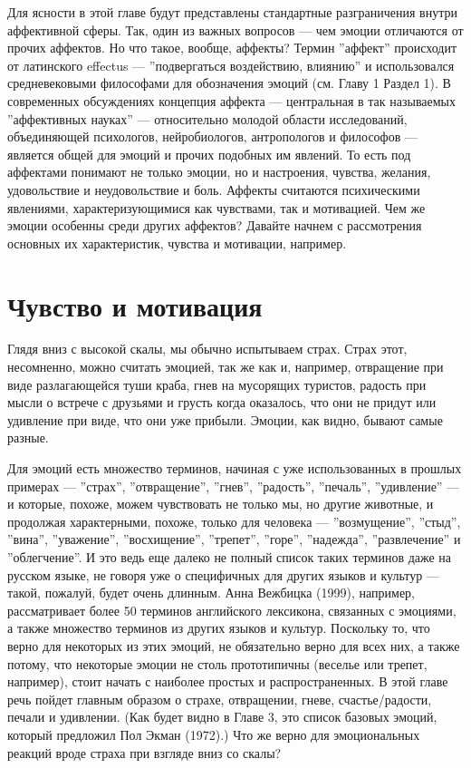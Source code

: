 \documentclass[11pt]{book}
\begin{document}
Для ясности в этой главе будут представлены стандартные разграничения внутри аффективной сферы. Так, один из важных вопросов --- чем эмоции отличаются от прочих аффектов. Но что такое, вообще, аффекты? Термин ''аффект'' происходит от латинского effectus --- ''подвергаться воздействию, влиянию'' и использовался средневековыми философами для обозначения эмоций (см. Главу 1 Раздел 1). В современных обсуждениях концепция аффекта --- центральная в так называемых ''аффективных науках'' --- относительно молодой области исследований, объединяющей психологов, нейробиологов, антропологов и философов --- является общей для эмоций и прочих подобных им явлений. То есть под аффектами понимают не только эмоции, но и настроения, чувства, желания, удовольствие и неудовольствие и боль. Аффекты считаются психическими явлениями, характеризующимися как чувствами, так и мотивацией. Чем же эмоции особенны среди других аффектов? Давайте начнем с рассмотрения основных их характеристик, чувства и мотивации, например.

\section{Чувство и мотивация}

Глядя вниз с высокой скалы, мы обычно испытываем страх. Страх этот, несомненно, можно считать эмоцией, так же как и, например, отвращение при виде разлагающейся туши краба, гнев на мусорящих туристов, радость при мысли о встрече с друзьями и грусть когда оказалось, что они не придут или удивление при виде, что они уже прибыли. Эмоции, как видно, бывают самые разные.

Для эмоций есть множество терминов, начиная с уже использованных в прошлых примерах --- ''страх'', ''отвращение'', ''гнев'', ''радость'', ''печаль'', ''удивление'' --- и которые, похоже, можем чувствовать не только мы, но другие животные, и продолжая характерными, похоже, только для человека --- ''возмущение'', ''стыд'', ''вина'', ''уважение'', ''восхищение'', ''трепет'', ''горе'', ''надежда'', ''развлечение'' и ''облегчение''. И это ведь еще далеко не полный список таких терминов даже на русском языке, не говоря уже о специфичных для других языков и культур --- такой, пожалуй, будет очень длинным. Анна Вежбицка (1999), например, рассматривает более 50 терминов английского лексикона, связанных с эмоциями, а также множество терминов из других языков и культур. Поскольку то, что верно для некоторых из этих эмоций, не обязательно верно для всех них, а также потому, что некоторые эмоции не столь прототипичны (веселье или трепет, например), стоит начать с наиболее простых и распространенных. В этой главе речь пойдет главным образом о страхе, отвращении, гневе, счастье/радости, печали и удивлении. (Как будет видно в Главе 3, это список базовых эмоций, который предложил Пол Экман (1972).) Что же верно для эмоциональных реакций вроде страха при взгляде вниз со скалы?
\end{document}
